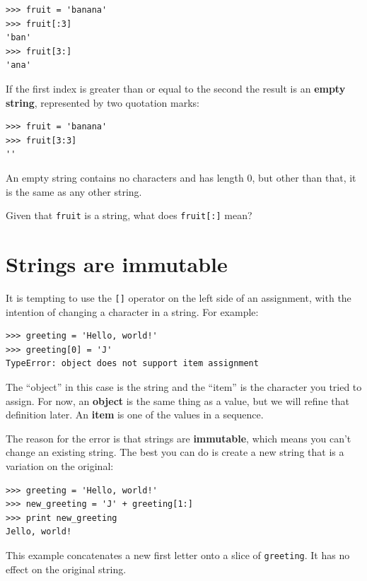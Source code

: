 \documentclass[10pt]{book}
\begin{document}
\beforeverb
\begin{verbatim}
>>> fruit = 'banana'
>>> fruit[:3]
'ban'
>>> fruit[3:]
'ana'
\end{verbatim}
\afterverb
%
If the first index is greater than or equal to the second the result
is an {\bf empty string}, represented by two quotation marks:


\beforeverb
\begin{verbatim}
>>> fruit = 'banana'
>>> fruit[3:3]
''
\end{verbatim}
\afterverb
%
An empty string contains no characters and has length 0, but other
than that, it is the same as any other string.

\begin{ex}
Given that {\tt fruit} is a string, what does
{\tt fruit[:]} mean?



\end{ex}


\section{Strings are immutable}

It is tempting to use the {\tt []} operator on the left side of an
assignment, with the intention of changing a character in a string.
For example:


\beforeverb
\begin{verbatim}
>>> greeting = 'Hello, world!'
>>> greeting[0] = 'J'
TypeError: object does not support item assignment
\end{verbatim}
\afterverb
%
The ``object'' in this case is the string and the ``item'' is
the character you tried to assign.  For now, an {\bf object} is
the same thing as a value, but we will refine that definition
later.  An {\bf item} is one of the values in a sequence.


The reason for the error is that
strings are {\bf immutable}, which means you can't change an
existing string.  The best you can do is create a new string
that is a variation on the original:

\beforeverb
\begin{verbatim}
>>> greeting = 'Hello, world!'
>>> new_greeting = 'J' + greeting[1:]
>>> print new_greeting
Jello, world!
\end{verbatim}
\afterverb
%
This example concatenates a new first letter onto
a slice of {\tt greeting}.  It has no effect on
the original string.
\end{document}
